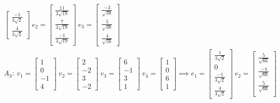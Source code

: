 \begin{gather*}
\begin{bmatrix}
        \frac{-1}{3\sqrt{2}}\\
        \frac{4}{3\sqrt{2}} 
    \end{bmatrix}
    ~ e_2 = \begin{bmatrix}
        \frac{11}{3\sqrt{19}}\\
        \frac{7}{3\sqrt{19}}\\
        \frac{-1}{3\sqrt{19}} 
    \end{bmatrix}
    ~ e_3 = \begin{bmatrix}
        \frac{-3}{\sqrt{38}}\\
        \frac{5}{\sqrt{38}}\\
        \frac{4}{\sqrt{38}} 
    \end{bmatrix}
    \\
    A_3:~
    v_1 = \begin{bmatrix}
        1\\
        0\\
        -1\\
        4 
    \end{bmatrix}
    ~ v_2 = \begin{bmatrix}
        2\\
        -2\\
        3\\
        -2  
    \end{bmatrix}
    ~ v_3 = \begin{bmatrix}
        6\\
        -1\\
        3\\
        1 
    \end{bmatrix}
    ~ v_4 = \begin{bmatrix}
        1\\
        0\\
        6\\
        1 
    \end{bmatrix}
    \implies
    e_1 = \begin{bmatrix}
        \frac{1}{3\sqrt{2}}\\
        0\\
        \frac{-1}{3\sqrt{2}}\\
        \frac{4}{3\sqrt{2}}
    \end{bmatrix}
    ~ e_2 = \begin{bmatrix}
        \frac{5}{\sqrt{66}}\\
        \frac{-4}{\sqrt{66}}\\
        \frac{5}{\sqrt{66}}\\

\end{bmatrix}
\end{gather*}
